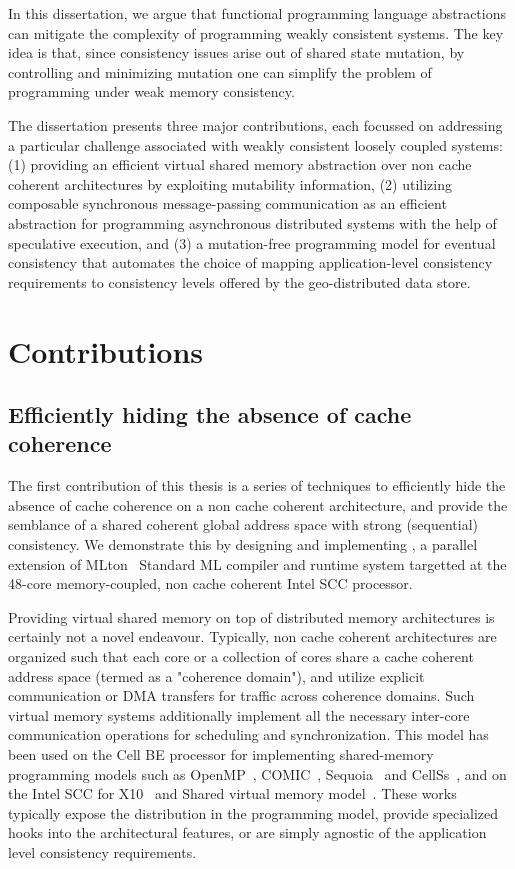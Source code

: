 In this dissertation, we argue that functional programming language
abstractions can mitigate the complexity of programming weakly consistent
systems. The key idea is that, since consistency issues arise out of shared
state mutation, by controlling and minimizing mutation one can simplify the
problem of programming under weak memory consistency.

The dissertation presents three major contributions, each focussed on
addressing a particular challenge associated with weakly consistent loosely
coupled systems: (1) providing an efficient virtual shared memory abstraction
over non cache coherent architectures by exploiting mutability information, (2)
utilizing composable synchronous message-passing communication as an efficient
abstraction for programming asynchronous distributed systems with the help of
speculative execution, and (3) a mutation-free programming model for eventual
consistency that automates the choice of mapping application-level consistency
requirements to consistency levels offered by the geo-distributed data store.

\section{Contributions}

\subsection{Efficiently hiding the absence of cache coherence}

The first contribution of this thesis is a series of techniques to efficiently
hide the absence of cache coherence on a non cache coherent architecture, and
provide the semblance of a shared coherent global address space with strong
(sequential) consistency. We demonstrate this by designing and implementing
\MMSCC, a parallel extension of MLton~\cite{MLton} Standard ML compiler and
runtime system targetted at the 48-core memory-coupled, non cache coherent
Intel SCC processor.

Providing virtual shared memory on top of distributed memory architectures is
certainly not a novel endeavour. Typically, non cache coherent architectures
are organized such that each core or a collection of cores share a cache
coherent address space (termed as a "coherence domain"), and utilize explicit
communication or DMA transfers for traffic across coherence domains. Such
virtual memory systems additionally implement all the necessary inter-core
communication operations for scheduling and synchronization. This model has
been used on the Cell BE processor for implementing shared-memory programming
models such as OpenMP~\cite{OBrien2008}, COMIC~\cite{Lee2008},
Sequoia~\cite{Houston2008} and CellSs~\cite{Bellens2006}, and on the Intel SCC
for X10~\cite{Chapman2011} and Shared virtual memory model~\cite{Lankes2012}.
These works typically expose the distribution in the programming model, provide
specialized hooks into the architectural features, or are simply agnostic of
the application level consistency requirements.


